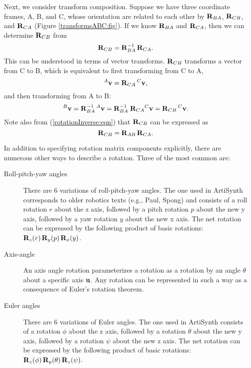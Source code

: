 Next, we consider transform composition. Suppose we have three
coordinate frames, A, B, and C, whose orientation are related to each other by
${\bf R}_{BA}$, ${\bf R}_{CB}$, and ${\bf R}_{CA}$ (Figure
\ref{transformsABC:fig}).  If we know ${\bf R}_{BA}$ and ${\bf R}_{CA}$,
then we can determine ${\bf R}_{CB}$ from
%
\begin{equation}
{\bf R}_{CB} = {\bf R}_{BA}^{-1} \, {\bf R}_{CA}.
\label{rotationCB:eqn}
\end{equation}
%
This can be understood in terms of vector transforms. ${\bf R}_{CB}$
transforms a vector from C to B, which is equivalent to first
transforming from C to A,
%
\begin{equation}
{}^A{\bf v} = {\bf R}_{CA} \, {}^C{\bf v},
\end{equation}
%
and then transforming from A to B:
%
\begin{equation}
{}^B{\bf v} = {\bf R}_{BA}^{-1} \, {}^A{\bf v} = {\bf R}_{BA}^{-1} \; {\bf R}_{CA} {}^C{\bf v} = {\bf R}_{CB} \, {}^C{\bf v}.
\end{equation}
%
Note also from (\ref{rotationInverse:eqn}) that ${\bf R}_{CB}$ can be 
expressed as
%
\begin{equation}
{\bf R}_{CB} = {\bf R}_{AB} \, {\bf R}_{CA}.
\label{rotationCBII:eqn}
\end{equation}
%

In addition to specifying rotation matrix components explicitly,
there are numerous other ways to describe a rotation.
Three of the most common are:

\begin{description}

\item[Roll-pitch-yaw angles]\mbox{}

There are 6 variations of roll-pitch-yaw angles. The one used in
ArtiSynth corresponds to older robotics texts (e.g., Paul, Spong) and
consists of a roll rotation $r$ about the z axis, followed by a pitch
rotation $p$ about the new y axis, followed by a yaw rotation $y$
about the new x axis. The net rotation can be expressed by the
following product of basic rotations: ${\bf R}_z(r) \, {\bf R}_y(p) \, {\bf R}_x(y)$.

\item[Axis-angle]\mbox{}

An axis angle rotation parameterizes a rotation as a rotation by
an angle $\theta$ about a specific axis ${\bf u}$. Any rotation
can be represented in such a way as a consequence of Euler's rotation
theorem.

\item[Euler angles]\mbox{}

There are 6 variations of Euler angles. The one used in ArtiSynth
consists of a rotation $\phi$ about the z axis, followed by a rotation
$\theta$ about the new y axis, followed by a rotation $\psi$ about the
new z axis. The net rotation can be expressed by the following product
of basic rotations: ${\bf R}_z(\phi) \, {\bf R}_y(\theta) \, {\bf R}_z(\psi)$.

\end{description}


